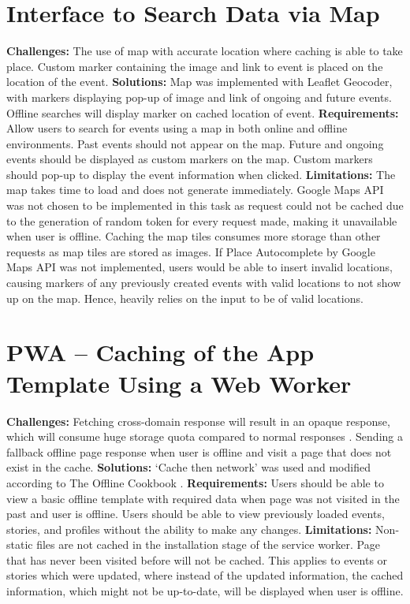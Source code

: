 \documentclass[11pt, a4paper]{article}
\begin{document}
\section{Interface to Search Data via Map}
\textbf{Challenges:} The use of map with accurate location where caching is able to take place.
Custom marker containing the image and link to event is placed on the location of the event.
\textbf{Solutions:} Map was implemented with Leaflet Geocoder, with markers displaying pop-up of
image and link of ongoing and future events. Offline searches will display marker on cached location
of event. \textbf{Requirements:} Allow users to search for events using a map in both online and
offline environments. Past events should not appear on the map. Future and ongoing events should be
displayed as custom markers on the map. Custom markers should pop-up to display the event
information when clicked. \textbf{Limitations:} The map takes time to load and does not generate
immediately. Google Maps API was not chosen to be implemented in this task as request could not be
cached due to the generation of random token for every request made, making it unavailable when user
is offline. Caching the map tiles consumes more storage than other requests as map tiles are stored
as images. If Place Autocomplete by Google Maps API \cite{google_maps_api} was not implemented,
users would be able to insert invalid locations, causing markers of any previously created events
with valid locations to not show up on the map. Hence, heavily relies on the input to be of valid
locations.

\section{PWA – Caching of the App Template Using a Web Worker}
\textbf{Challenges:} Fetching cross-domain response will result in an opaque response, which will
consume huge storage quota compared to normal responses \cite{opaque_workbox}. Sending a fallback
offline page response when user is offline and visit a page that does not exist in the cache.
\textbf{Solutions:} `Cache then network' was used and modified according to The Offline Cookbook
\cite{offline_cookbook}. \textbf{Requirements:} Users should be able to view a basic offline
template with required data when page was not visited in the past and user is offline. Users should
be able to view previously loaded events, stories, and profiles without the ability to make any
changes. \textbf{Limitations:} Non-static files are not cached in the installation stage
of the service worker. Page that has never been visited before will not be cached. This applies to
events or stories which were updated, where instead of the updated information, the cached
information, which might not be up-to-date, will be displayed when user is offline.
\end{document}
